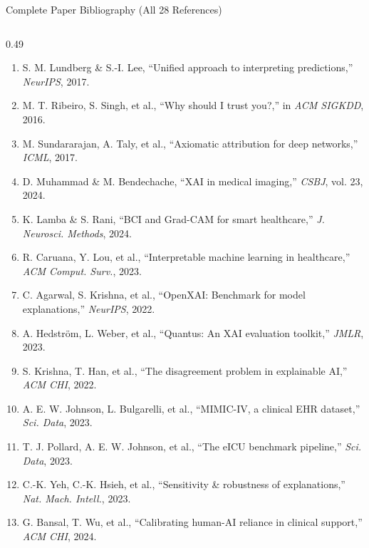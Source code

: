 \documentclass[aspectratio=169,10pt]{beamer}
\begin{document}
\begin{frame}{Complete Paper Bibliography (All 28 References)}
  \vspace{-0.1cm}
  \begin{columns}[t]
    \begin{column}{0.49\textwidth}
      \tiny
      \begin{enumerate}\setlength\itemsep{0.5pt}
        \item S. M. Lundberg \& S.-I. Lee, ``Unified approach to interpreting predictions,'' \textit{NeurIPS}, 2017.
        \item M. T. Ribeiro, S. Singh, et al., ``Why should I trust you?,'' in \textit{ACM SIGKDD}, 2016.
        \item M. Sundararajan, A. Taly, et al., ``Axiomatic attribution for deep networks,'' \textit{ICML}, 2017.
        \item D. Muhammad \& M. Bendechache, ``XAI in medical imaging,'' \textit{CSBJ}, vol. 23, 2024.
        \item K. Lamba \& S. Rani, ``BCI and Grad-CAM for smart healthcare,'' \textit{J. Neurosci. Methods}, 2024.
        \item R. Caruana, Y. Lou, et al., ``Interpretable machine learning in healthcare,'' \textit{ACM Comput. Surv.}, 2023.
        \item C. Agarwal, S. Krishna, et al., ``OpenXAI: Benchmark for model explanations,'' \textit{NeurIPS}, 2022.
        \item A. Hedstr\"om, L. Weber, et al., ``Quantus: An XAI evaluation toolkit,'' \textit{JMLR}, 2023.
        \item S. Krishna, T. Han, et al., ``The disagreement problem in explainable AI,'' \textit{ACM CHI}, 2022.
        \item A. E. W. Johnson, L. Bulgarelli, et al., ``MIMIC-IV, a clinical EHR dataset,'' \textit{Sci. Data}, 2023.
        \item T. J. Pollard, A. E. W. Johnson, et al., ``The eICU benchmark pipeline,'' \textit{Sci. Data}, 2023.
        \item C.-K. Yeh, C.-K. Hsieh, et al., ``Sensitivity \& robustness of explanations,'' \textit{Nat. Mach. Intell.}, 2023.
        \item G. Bansal, T. Wu, et al., ``Calibrating human-AI reliance in clinical support,'' \textit{ACM CHI}, 2024.

\end{enumerate}
\end{column}
\end{columns}
\end{frame}
\end{document}
